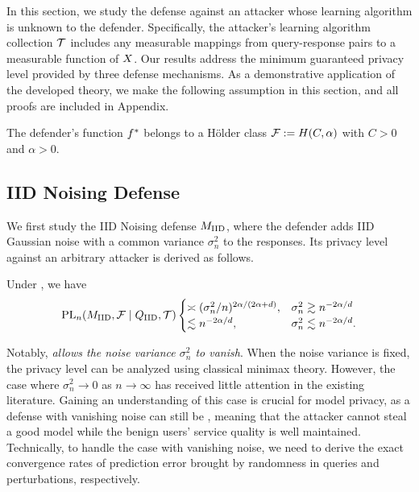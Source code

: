 
In this section, we study the defense against an attacker whose learning algorithm is unknown to the defender. Specifically, the attacker's learning algorithm collection $\mathcal{T}$ includes any measurable mappings from query-response pairs to a measurable function of $X$. Our results address the minimum guaranteed privacy level provided by three defense mechanisms.
As a demonstrative application of the developed theory, we make the following assumption in this section, and all proofs are included in Appendix.

\begin{assumption} \label{asmp:func}
    The defender's function $f^*$ belongs to a H\"{o}lder class $\mathcal{F} := H(C,\alpha)$ with $C>0$ and $\alpha>0$.
\end{assumption}


\subsection{IID Noising Defense}
    We first study the IID Noising defense $M_{\textrm{IID}}$, where the defender adds IID Gaussian noise with a common variance $\sigma_n^2$
    to the responses. Its privacy level against an arbitrary attacker is derived as follows.

     \begin{theorem} %
     \label{ex:holderIID}
        Under ,
        we have
        \begin{align*}
            \textrm{PL}_n(M_{\textrm{IID}},\mathcal{F}\mid Q_{\textrm{IID}},\mathcal{T}) \begin{cases} 
            \asymp  (\sigma_n^2/n)^{2\alpha/(2\alpha+d)}, & \sigma_n^2 \gtrsim n^{-2\alpha/d} \\ 
            \lesssim n^{-2\alpha/d} , & \sigma_n^2 \lesssim n^{-2\alpha/d}.
            \end{cases}
        \end{align*}
    \end{theorem}

    Notably,  \textit{allows the noise variance $\sigma_n^2$ to vanish}. When the noise variance is fixed, the privacy level can be analyzed using classical minimax theory. However, the case where $\sigma^2_n \to 0$ as $n \to \infty$ has received little attention in the existing literature. Gaining an understanding of this case is crucial for model privacy, as a defense with vanishing noise can still be \eco, meaning that the attacker cannot steal a good model while the benign users' service quality is well maintained. Technically, to handle the case with vanishing noise, we need to derive the exact convergence rates of prediction error brought by randomness in queries and perturbations, respectively. 

